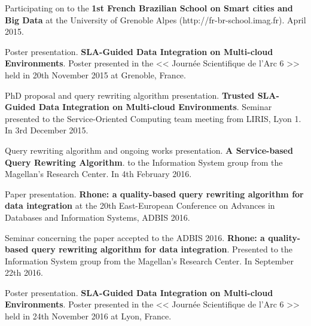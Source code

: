 \bigskip
\noindent
Participating on to the \textbf{1st French Brazilian School on Smart cities and Big Data} at the
University of Grenoble Alpes (http://fr-br-school.imag.fr). April 2015.

\bigskip
\noindent
Poster presentation. \textbf{SLA-Guided Data Integration on Multi-cloud Environments}. Poster presented in the << Journ\'ee Scientifique de l'Arc 6 >> held in 20th November 2015 at Grenoble, France. 

\bigskip
\noindent
PhD proposal and query rewriting algorithm presentation. \textbf{Trusted SLA-Guided Data Integration on Multi-cloud Environments}. Seminar presented to the Service-Oriented Computing team meeting from LIRIS, Lyon 1. In 3rd December 2015.

\bigskip
\noindent
Query rewriting algorithm and ongoing works presentation. \textbf{A Service-based Query Rewriting Algorithm}. to the Information System group from the Magellan's Research Center. In 4th February 2016.

\bigskip
\noindent
Paper presentation. \textbf{Rhone: a quality-based query rewriting algorithm for data integration} at the 20th East-European Conference on Advances in Databases and Information Systems, ADBIS 2016.

\noindent
Seminar concerning the paper accepted to the ADBIS 2016. \textbf{Rhone: a quality-based query rewriting algorithm for data integration}. Presented to the Information System group from the Magellan's Research Center. In September 22th 2016.

\bigskip
\noindent
Poster presentation. \textbf{SLA-Guided Data Integration on Multi-cloud Environments}. Poster presented in the << Journ\'ee Scientifique de l'Arc 6 >> held in 24th November 2016 at Lyon, France. 